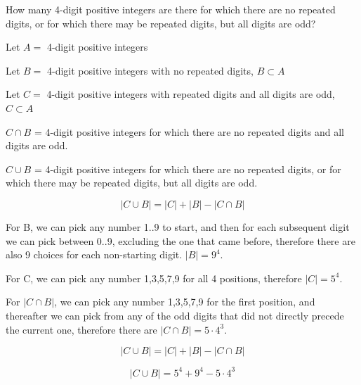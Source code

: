 \documentclass[openany, 11pt]{book}
\begin{document}
\begin{exercise}{}{}
	How many 4-digit positive integers are there for which
	there are no repeated digits, or for which there may be repeated digits, but
	all digits are odd?
	\begin{alist}
		\item Let $A=$ 4-digit positive integers
		\item Let $B=$ 4-digit positive integers with no repeated digits, $B \subset
			A$
		\item Let $C=$ 4-digit positive integers with repeated digits and all digits
		are odd, $C \subset A$
		\item $C\cap B$  = 4-digit positive integers for which there are
		no repeated digits and all digits are odd.
		\item $C\cup B$  = 4-digit positive integers for which there are
		no repeated digits, or for which there may be repeated digits, but all
		digits are odd.
		\item
		$$|C\cup B| = |C| + |B| - |C\cap B|$$
		\item For B, we can pick any number 1..9 to start, and then for each
		subsequent digit we can pick between 0..9, excluding the one that came
		before, therefore there are also 9 choices for each non-starting digit.
		$|B| = 9^4$.
		\item For C, we can pick any number 1,3,5,7,9 for all 4 positions, therefore
		$|C|=5^4$.
		\item For $|C\cap B|$, we can pick any number 1,3,5,7,9 for the first
		position, and thereafter we can pick from any of the odd digits that did
		not directly precede the current one, therefore there are $|C \cap
			B|=5\cdot4^3$.
		\item $$|C\cup B| = |C| + |B| - |C\cap B|$$
		\item $$|C\cup B| = 5^4+9^4-5\cdot 4^3$$
	\end{alist}
\end{exercise}
\end{document}

